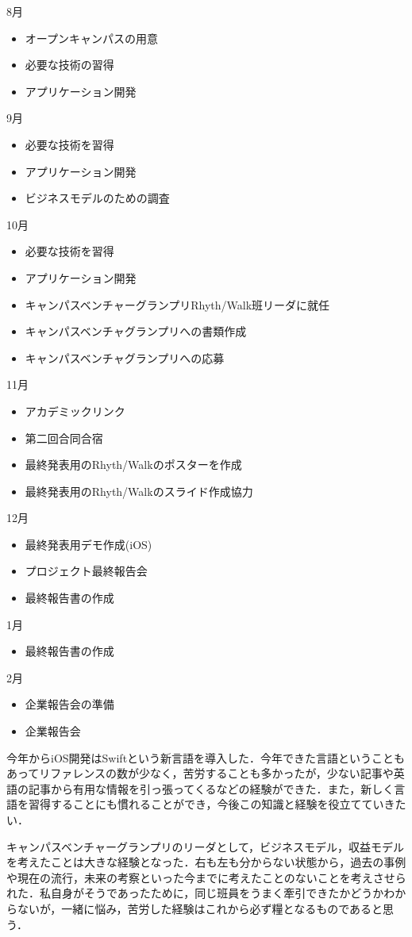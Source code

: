 8月
\begin{itemize}
\item オープンキャンパスの用意
\item 必要な技術の習得
\item アプリケーション開発
\end{itemize}
9月
\begin{itemize}
\item 必要な技術を習得
\item アプリケーション開発
\item ビジネスモデルのための調査
\end{itemize}
10月
\begin{itemize}
\item 必要な技術を習得
\item アプリケーション開発
\item キャンパスベンチャーグランプリRhyth/Walk班リーダに就任
\item キャンパスベンチャグランプリへの書類作成
\item キャンパスベンチャグランプリへの応募
\end{itemize}
11月
\begin{itemize}
\item アカデミックリンク
\item 第二回合同合宿
\item 最終発表用のRhyth/Walkのポスターを作成
\item 最終発表用のRhyth/Walkのスライド作成協力
\end{itemize}
12月
\begin{itemize}
\item 最終発表用デモ作成(iOS)
\item プロジェクト最終報告会
\item 最終報告書の作成
\end{itemize}
1月
\begin{itemize}
\item 最終報告書の作成
\end{itemize}
2月
\begin{itemize}
\item 企業報告会の準備
\item 企業報告会
\end{itemize}
\par
今年からiOS開発はSwiftという新言語を導入した．今年できた言語ということもあってリファレンスの数が少なく，苦労することも多かったが，少ない記事や英語の記事から有用な情報を引っ張ってくるなどの経験ができた．また，新しく言語を習得することにも慣れることができ，今後この知識と経験を役立てていきたい．
\par
キャンパスベンチャーグランプリのリーダとして，ビジネスモデル，収益モデルを考えたことは大きな経験となった．右も左も分からない状態から，過去の事例や現在の流行，未来の考察といった今までに考えたことのないことを考えさせられた．私自身がそうであったために，同じ班員をうまく牽引できたかどうかわからないが，一緒に悩み，苦労した経験はこれから必ず糧となるものであると思う．
